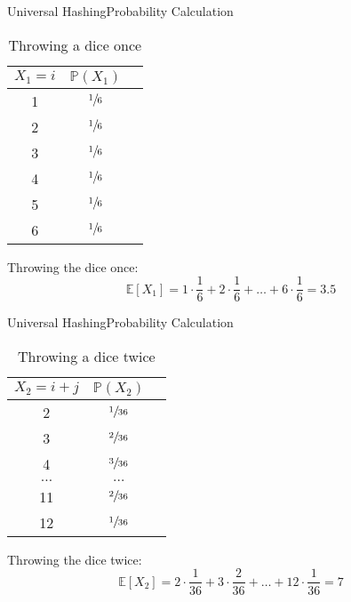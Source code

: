 
\begin{frame}{Universal Hashing}{Probability Calculation}
  \vspace*{-1.5em}
  \begin{table}[!h]
    \caption{Throwing a dice once}
    \label{tab:probabilities:value_rolling_dice_once}
    \begin{tabularx}{0.25\linewidth}{c|cc}
      $X_1 = i$ & $\mathbb{P}(X_1)$\\
      \midrule
      1 & $\sfrac{1}{6}$\\
      2 & $\sfrac{1}{6}$\\
      3 & $\sfrac{1}{6}$\\
      4 & $\sfrac{1}{6}$\\
      5 & $\sfrac{1}{6}$\\
      6 & $\sfrac{1}{6}$\\
    \end{tabularx}
  \end{table}
  Throwing the dice once:
  \[\mathbb{E}[X_1] = 1 \cdot \frac{1}{6} + 2 \cdot \frac{1}{6}
    + \dots + 6 \cdot \frac{1}{6} = 3.5\]
\end{frame}


\begin{frame}{Universal Hashing}{Probability Calculation}
  \vspace*{-1.5em}
  \begin{table}[!h]
    \caption{Throwing a dice twice}
    \label{tab:probabilities:value_rolling_dice_twice}
    \begin{tabularx}{0.275\linewidth}{c|cc}
      $X_2 = i + j$ & $\mathbb{P}(X_2)$\\
      \midrule
      2 & $\sfrac{1}{36}$\\
      3 & $\sfrac{2}{36}$\\
      4 & $\sfrac{3}{36}$\\
      $\dots$ & $\dots$\\
      11 & $\sfrac{2}{36}$\\
      12 & $\sfrac{1}{36}$\\
    \end{tabularx}
  \end{table}
  Throwing the dice twice:
  \[\mathbb{E}[X_2] = 2 \cdot \frac{1}{36} + 3 \cdot \frac{2}{36}
    + \dots + 12 \cdot \frac{1}{36} = 7\]
\end{frame}

